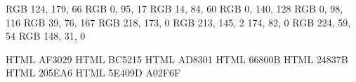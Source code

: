 \definecolor{vertHerbe}   {RGB} {124, 179,  66}
\definecolor{vertSapin}   {RGB} {  0,  95,  17}
\definecolor{vertSombre}  {RGB} { 14,  84,  60}
\definecolor{cyan}        {RGB} {  0, 140, 128}
\definecolor{cyanSombre}  {RGB} {  0,  98, 116}
\definecolor{bleuPale}    {RGB} { 39,  76, 167}
\definecolor{jauneClair}  {RGB} {218, 173,   0}
\definecolor{jauneSombre} {RGB} {213, 145,   2}
\definecolor{orangeSombre}{RGB} {174,  82,   0}
\definecolor{rougeClair}  {RGB} {224,  59,  54}
\definecolor{rougeSombre} {RGB} {148,  31,   0}


\definecolor{red600}    {HTML} {AF3029}
\definecolor{orange600} {HTML} {BC5215}
\definecolor{yellow600} {HTML} {AD8301}
\definecolor{green600}  {HTML} {66800B}
\definecolor{cyan600}   {HTML} {24837B}
\definecolor{blue600}   {HTML} {205EA6}
\definecolor{purple600} {HTML} {5E409D}
\definecolor{magenta600}{HTML} {A02F6F}